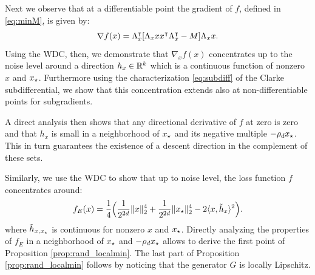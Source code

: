 Next we observe that at a differentiable point the gradient of $f$, defined in \eqref{eq:minM}, is given by:
\begin{equation}\label{eq:gradx}
\nabla f(x) = \Lambda_x^\intercal [\Lambda_x x x^\intercal \Lambda_x^\intercal - M ] \Lambda_x x.
\end{equation}
Using the WDC, then, we demonstrate that $\nabla_x f(x)$ concentrates up to the noise level around a direction $h_x \in \mathbb{R}^k$ which is a continuous function of nonzero $x$ and ${x_{\star}}$.
Furthermore using the characterization \eqref{eq:subdiff} of the Clarke subdifferential,
we show that this concentration extends also at non-differentiable points for subgradients.

A direct analysis then shows that any directional derivative of $f$ at zero is zero and
that $h_x$ is small in a neighborhood 
of ${x_{\star}}$ and its negative multiple $-\rho_d {x_{\star}}$. This in turn guarantees the existence of a descent direction in the complement of these sets.

Similarly, we use the WDC to show
that up to noise level, the loss function $f$ concentrates around:
\[
f_E(x) = \frac{1}{4} \Big( \frac{1}{2^{2d}} \|x\|^4_2 +  \frac{1}{2^{2d}} \|{x_{\star}}\|^4_2  - 2 \langle x, \tilde{h}_x\rangle^2 \Big).
\]
where $\tilde{h}_{x,{x_{\star}}}$ is  continuous for nonzero $x$ and ${x_{\star}}$. 
Directly analyzing the properties of $f_E$ in a neighborhood of ${x_{\star}}$ and $-\rho_d {x_{\star}}$ allows to derive the first point of Proposition \ref{prop:rand_localmin}. The last part of Proposition \ref{prop:rand_localmin} follows by noticing that the generator $G$ is locally Lipschitz.

